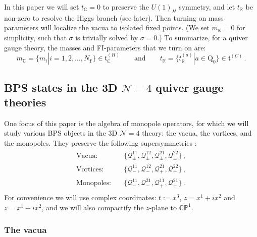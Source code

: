 \documentclass[12pt,a4paper]{article}
\renewcommand{\(}{\left(}
\renewcommand{\)}{\right)}
\renewcommand{\(}{\left(}
\renewcommand{\)}{\right)}
\begin{document}
\medskip

In this paper we will 
set $t_{\mathbb{C}}=0$ to preserve the $U(1)_H$ symmetry, and let $t_{\mathbb{R}}$ be non-zero to resolve the Higgs branch (see later). Then turning on mass parameters will localize the vacua to isolated fixed points. 
(We set $m_{\mathbb{R}}=0$ for simplicity, such that $\sigma$ is trivially solved by $\sigma=0$.)
To summarize, for a quiver gauge theory, the masses and FI-parameters that we turn on are:
\begin{equation}
m_{\mathbb{C}} =\{m_i|i=1,2,\dots,N_{\mathtt{f}}\} \in \mathfrak{t}^{(H)}_{\mathbb{C}} 
\qquad\textrm{and}\qquad
t_{\mathbb{R}}=\{t^{(a)}_{\mathbb{R}}|a\in \textrm{Q}_0\}  \in \mathfrak{t}^{(C)}\,. 
\end{equation}



\subsection{\texorpdfstring{BPS states in the 3D $\mathcal{N}=4$ quiver gauge theories}{BPS states in the 3D N=4 quiver gauge theories}}\label{ssec:BPS_in_3D_N4}
One focus of this paper is the algebra of monopole operators, for which we will study various BPS objects in the 3D $\mathcal{N}=4$ theory: the vacua, the vortices, and the monopoles. They preserve the following supersymmetries \cite{Bullimore:2016hdc}:
\begin{equation}\label{eq:BPS_property}
\begin{aligned}
\text{Vacua:}&\quad \{\mathcal{Q}^{1\dot{1}}_{\pm},\mathcal{Q}^{1\dot{2}}_{\pm},\mathcal{Q}^{2\dot{1}}_{\pm},\mathcal{Q}^{2\dot{2}}_{\pm}\}\,,\\
\text{Vortices:}&\quad \{\mathcal{Q}^{1\dot{1}}_{-},\mathcal{Q}^{1\dot{2}}_{-},\mathcal{Q}^{2\dot{1}}_{+},\mathcal{Q}^{2\dot{2}}_{+}\}\,,\\
\text{Monopoles:}&\quad \{\mathcal{Q}^{1\dot{1}}_{-},\mathcal{Q}^{2\dot{1}}_{-},\mathcal{Q}^{1\dot{1}}_{+},\mathcal{Q}^{2\dot{1}}_{+}\}\,.\\
\end{aligned}
\end{equation}
For convenience we will use complex coordinates:
$t:=x^3$, $z=x^1+ix^2$ and $\bar{z}=x^1-ix^2$, 
and we will also compactify the $z$-plane to $\mathbb{CP}^1$.

\subsubsection{The vacua}
\end{document}
